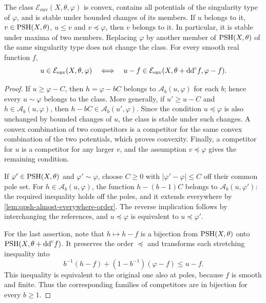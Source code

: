 \begin{proposition}\label{prop:relative-elementary}
The class $\mathcal E_{\mathrm{env}}(X,\theta,\varphi)$ is convex, contains all potentials of the singularity type of $\varphi$, and is stable under bounded changes of its members. If $u$ belongs to it, $v\in\mathrm{PSH}(X,\theta)$, $u\leq v$ and $v\preceq\varphi$, then $v$ belongs to it. In particular, it is stable under maxima of two members. Replacing $\varphi$ by another member of $\mathrm{PSH}(X,\theta)$ of the same singularity type does not change the class.
For every smooth real function $f$,
\[
 u\in\mathcal E_{\mathrm{env}}(X,\theta,\varphi)
 \quad\Longleftrightarrow\quad
 u-f\in\mathcal E_{\mathrm{env}}(X,\theta+\mathrm{dd}^{\mathrm{c}} f,\varphi-f).
\]
\end{proposition}
\begin{proof}
If $u\geq\varphi-C$, then $h=\varphi-bC$ belongs to $\mathcal A_b(u,\varphi)$ for each $b$; hence every $u\sim\varphi$ belongs to the class. More generally, if $u'\geq u-C$ and $h\in\mathcal A_b(u,\varphi)$, then $h-bC\in\mathcal A_b(u',\varphi)$. Since the condition $u\preceq\varphi$ is also unchanged by bounded changes of $u$, the class is stable under such changes. A convex combination of two competitors is a competitor for the same convex combination of the two potentials, which proves convexity. Finally, a competitor for $u$ is a competitor for any larger $v$, and the assumption $v\preceq\varphi$ gives the remaining condition.

If $\varphi'\in\mathrm{PSH}(X,\theta)$ and $\varphi'\sim\varphi$, choose $C\geq0$ with $|\varphi'-\varphi|\leq C$ off their common pole set. For $h\in\mathcal A_b(u,\varphi)$, the function $h-(b-1)C$ belongs to $\mathcal A_b(u,\varphi')$: the required inequality holds off the poles, and it extends everywhere by \cref{lem:qpsh-almost-everywhere-order}. The reverse implication follows by interchanging the references, and $u\preceq\varphi$ is equivalent to $u\preceq\varphi'$.

For the last assertion, note that $h\mapsto h-f$ is a bijection from $\mathrm{PSH}(X,\theta)$ onto $\mathrm{PSH}(X,\theta+\mathrm{dd}^{\mathrm{c}} f)$. It preserves the order $\preceq$ and transforms each stretching inequality into
\[
 b^{-1}(h-f)+(1-b^{-1})(\varphi-f)\leq u-f.
\]
This inequality is equivalent to the original one also at poles, because $f$ is smooth and finite. Thus the corresponding families of competitors are in bijection for every $b\geq1$.
\end{proof}

